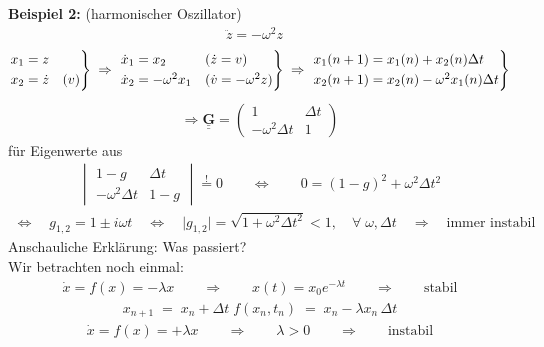 \documentclass[12pt]{article}
\begin{document}
\textbf{Beispiel 2:} (harmonischer Oszillator)
\begin{align}
\ddot{z}= - \omega^2 z &  
\end{align}
\begin{align*}
\begin{rcases}
x_1 = z \\
x_2 = \dot{z} &(v)
\end{rcases}
\; \Rightarrow \; 
\begin{rcases}
\dot{x}_1 = x_2  & (\dot{z}=v) \\
\dot{x}_2 = - \omega^2 x_1 & (\dot{v}= - \omega ^2 z)
\end{rcases}  
\;  \Rightarrow \; 
\begin{rcases}
x_1 (n+1) = x_1(n) + x_2 (n) \Delta t \\
x_2 (n+1) = x_2(n) - \omega^2 x_1 (n) \Delta t
\end{rcases} 
\end{align*}
\begin{align}
\Rightarrow \underline{ \underline{\mathbf{G} }} = 
\begin{pmatrix}
 1 & \Delta t \\
 - \omega^2 \Delta t & 1
\end{pmatrix}
\end{align}
für Eigenwerte aus 
\begin{align}
\begin{vmatrix}
1-g & \Delta t \\
- \omega^2 \Delta t & 1-g
\end{vmatrix}
\overset{!}{=} 0 \quad \quad \Leftrightarrow \quad \quad 0=  (1-g)^2 + \omega^2 \Delta t^2 
\end{align}
\begin{align*}
\Leftrightarrow \quad  g_{1,2} = 1 \pm i\omega t \quad 
\Leftrightarrow  \quad \vert g_{1,2} \vert = \sqrt{1 + \omega^2 \Delta t^2} <1,\quad \forall \; \omega, \Delta t \quad \Rightarrow \quad  \mbox{immer instabil}
\end{align*}
Anschauliche Erklärung: Was passiert? \\
Wir betrachten noch einmal: 
 \begin{align}
\dot{x}= f(x) = - \lambda x \quad \quad \Rightarrow \quad \quad x(t) = x_0 e^{-\lambda t} \quad \quad \Rightarrow \quad \quad \text{stabil}
\end{align}
\begin{align*}
x_{n+1} \; = \; x_n + \Delta t \; f(x_n, t_n) \; = \; x_n - \lambda x_n \, \Delta t
\end{align*}
\begin{align*}
\dot{x} = f(x) = + \lambda x \quad \quad \Rightarrow \quad \quad \lambda > 0 \quad \quad \Rightarrow \quad \quad \text{instabil}
\end{align*}
\end{document}
